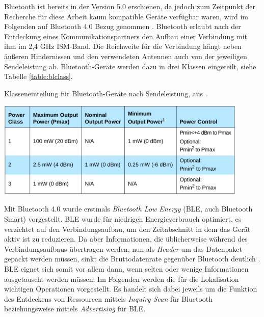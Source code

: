 Bluetooth ist bereits in der Version 5.0 erschienen, da jedoch zum Zeitpunkt der Recherche für diese Arbeit kaum kompatible Geräte verfügbar waren, wird im Folgenden auf Bluetooth 4.0 Bezug genommen \cite{blue2010spec}.
Bluetooth erlaubt nach der Entdeckung eines Kommunikationspartners den Aufbau einer Verbindung mit ihm im 2,4 GHz ISM-Band.
Die Reichweite für die Verbindung hängt neben äußeren Hindernissen und den verwendeten Antennen auch von der jeweiligen Sendeleistung ab.
Bluetooth-Geräte werden dazu in drei Klassen eingeteilt, siehe Tabelle \ref{table:blclass}.

\begin{table}[h]
  \centering
	\caption{Klasseneinteilung für Bluetooth-Geräte nach Sendeleistung, aus \cite{blue2010classes}.}
	\includegraphics[width=0.9\textwidth]{images/blueclasses.png}
  \label{table:blclass}
\end{table}

Mit Bluetooth 4.0 wurde erstmals \emph{Bluetooth Low Energy} (BLE, auch Bluetooth Smart) vorgestellt.
BLE wurde für niedrigen Energieverbrauch optimiert, es verzichtet auf den Verbindungsaufbau, um den Zeitabschnitt in dem das Gerät aktiv ist zu reduzieren.
Da aber Informationen, die üblicherweise während des Verbindungsaufbaus übertragen werden, nun als \emph{Header} um das Datenpaket gepackt werden müssen, sinkt die Bruttodatenrate gegenüber Bluetooth deutlich \cite{rigado2016practical}.
BLE eignet sich somit vor allem dann, wenn selten oder wenige Informationen ausgetauscht werden müssen.
Im Folgenden werden die für die Lokalisation wichtigen Operationen vorgestellt.
Es handelt sich dabei jeweils um die Funktion des Entdeckens von Ressourcen mittels \emph{Inquiry Scan} für Bluetooth beziehungsweise mittels \emph{Advertising} für BLE.


